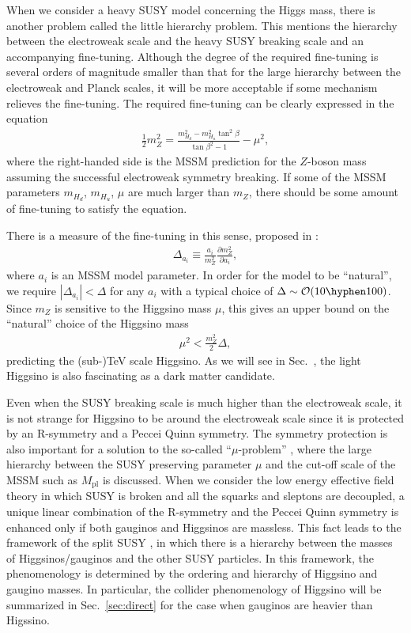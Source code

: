 \documentclass[12pt,twoside,book]{article}
\begin{document}
When we consider a heavy SUSY model concerning the Higgs mass, there is another problem called the little hierarchy problem.
This mentions the hierarchy between the electroweak scale and the heavy SUSY breaking scale and an accompanying fine-tuning.
Although the degree of the required fine-tuning is several orders of magnitude smaller than that for the large hierarchy between the electroweak and Planck scales, it will be more acceptable if some mechanism relieves the fine-tuning.
The required fine-tuning can be clearly expressed in the equation
\begin{align}
  \frac{1}{2} m_Z^2 = \frac{m_{H_d}^2 - m_{H_u}^2 \tan^2 \beta}{\tan \beta^2 - 1} - \mu^2,
\end{align}
where the right-handed side is the MSSM prediction for the $Z$-boson mass assuming the successful electroweak symmetry breaking.
If some of the MSSM parameters $m_{H_d}$, $m_{H_u}$, $\mu$ are much larger than $m_Z$, there should be some amount of fine-tuning to satisfy the equation.

There is a measure of the fine-tuning in this sense, proposed in \cite{Ellis:1986yg,Barbieri:1987fn}:
\begin{align}
  \Delta_{a_i} \equiv \frac{a_i}{m_Z^2} \frac{\partial m_Z^2}{\partial a_i},
\end{align}
where $a_i$ is an MSSM model parameter.
In order for the model to be ``natural'', we require $|\Delta_{a_i}| < \Delta$ for any $a_i$ with a typical choice of $\Delta \sim \mathcal{O}(10 \hyphen 100)$.
Since $m_Z$ is sensitive to the Higgsino mass $\mu$, this gives an upper bound on the ``natural'' choice of the Higgsino mass
\begin{align}
  \mu^2 < \frac{m_Z^2}{2} \Delta,
\end{align}
predicting the (sub-)TeV scale Higgsino.
As we will see in Sec.~, the light Higgsino is also fascinating as a dark matter candidate.

Even when the SUSY breaking scale is much higher than the electroweak scale, it is not strange for Higgsino to be around the electroweak scale since it is protected by an R-symmetry and a Peccei Quinn symmetry.
The symmetry protection is also important for a solution to the so-called ``$\mu$-problem'' \cite{Giudice:1988yz}, where the large hierarchy between the SUSY preserving parameter $\mu$ and the cut-off scale of the MSSM such as $M_{\mathrm{pl}}$ is discussed.
When we consider the low energy effective field theory in which SUSY is broken and all the squarks and sleptons are decoupled, a unique linear combination of the R-symmetry and the Peccei Quinn symmetry is enhanced only if both gauginos and Higgsinos are massless.
This fact leads to the framework of the split SUSY \cite{Giudice:2004tc}, in which there is a hierarchy between the masses of Higgsinos/gauginos and the other SUSY particles.
In this framework, the phenomenology is determined by the ordering and hierarchy of Higgsino and gaugino masses.
In particular, the collider phenomenology of Higgsino will be summarized in Sec.~\ref{sec:direct} for the case when gauginos are heavier than Higssino.
\end{document}
